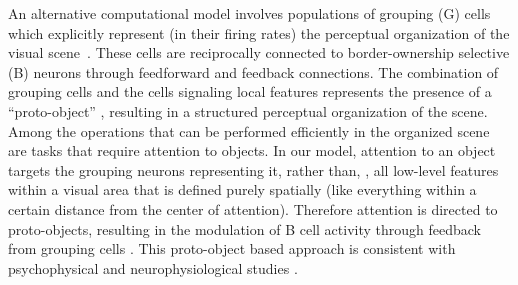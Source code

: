 An alternative computational model involves populations of grouping
(G) cells which explicitly represent (in their firing rates) the
perceptual organization of the visual scene~\citep{Schutze_etal03,Craft_etal07}. 
These cells are reciprocally connected to
border-ownership selective (B) neurons through feedforward and
feedback connections.  The combination of grouping cells and the cells
signaling local features represents the presence of a ``proto-object''
\citep{Rensink00a},
resulting in a structured perceptual
organization of the scene. Among the operations that can be performed
efficiently in the organized scene are tasks that require attention to objects. 
In our model, attention to an object targets the grouping neurons
representing it, rather than, \eg, all low-level features within 
a visual area that is defined purely spatially (like everything within
a certain distance from the center of attention).
Therefore attention is directed to proto-objects, resulting in the modulation of B cell activity through
feedback from grouping cells \citep{Mihalas_etal11b}.  This
proto-object based approach is consistent with psychophysical and
neurophysiological studies
\citep[\eg][]{Duncan84,Egly_etal94,Scholl01,Kimchi_etal07,Qiu_etal07,Ho_Yeh09,Poort_etal12}.

